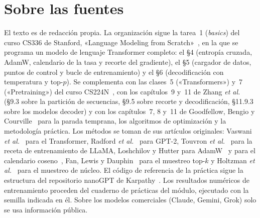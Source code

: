 \documentclass[11pt,a4paper,twoside,openany]{book}
\begin{document}
\section*{Sobre las fuentes}
El texto es de redacción propia. La organización sigue la tarea~1 (\emph{basics}) del curso CS336 de Stanford, «Language Modeling from Scratch»~\cite{cs336}, en la que se programa un modelo de lenguaje Transformer completo: el §4 (entropía cruzada, AdamW, calendario de la tasa y recorte del gradiente), el §5 (cargador de datos, puntos de control y bucle de entrenamiento) y el §6 (decodificación con temperatura y top-$p$). Se complementa con las clases~5 («Transformers») y~7 («Pretraining») del curso CS224N~\cite{cs224n}, con los capítulos~9 y~11 de Zhang \emph{et al.}~\cite{d2l} (§9.3 sobre la partición de secuencias, §9.5 sobre recorte y decodificación, §11.9.3 sobre los modelos decoder) y con los capítulos~7, 8 y~11 de Goodfellow, Bengio y Courville~\cite{gbc} para la parada temprana, los algoritmos de optimización y la metodología práctica. Los métodos se toman de sus artículos originales: Vaswani \emph{et al.}~\cite{vaswani} para el Transformer, Radford \emph{et al.}~\cite{gpt2} para GPT-2, Touvron \emph{et al.}~\cite{llama} para la receta de entrenamiento de LLaMA, Loshchilov y Hutter para AdamW~\cite{adamw} y para el calendario coseno~\cite{sgdr}, Fan, Lewis y Dauphin~\cite{fan} para el muestreo top-$k$ y Holtzman \emph{et al.}~\cite{holtzman} para el muestreo de núcleo. El código de referencia de la práctica sigue la estructura del repositorio nanoGPT de Karpathy~\cite{nanogpt}. Los resultados numéricos de entrenamiento proceden del cuaderno de prácticas del módulo, ejecutado con la semilla indicada en él. Sobre los modelos comerciales (Claude, Gemini, Grok) solo se usa información pública.
\end{document}
